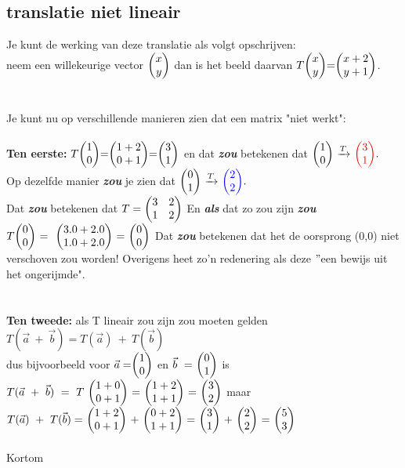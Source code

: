 \documentclass[hidelinks, a4wide, 12pt,  twoside]{book}
\begin{document}
\subsection{translatie niet lineair}
Je kunt de werking van deze translatie als volgt opschrijven:\\ neem een willekeurige vector $ \vectwee{x}{y} $ dan is het beeld daarvan $ T \vectwee{x}{y} = \vectwee{x+2}{y+1} $.\\ \\ \\
Je kunt nu op verschillende manieren zien dat een matrix "niet werkt":\\ \\
\textbf{ Ten eerste:} $ T \vectwee{1}{0} = \vectwee{1+2}{0+1} = \vectwee{3}{1} $ en dat \textit{\textbf{zou}} betekenen dat 
$ \vectwee{1}{0}  \  \xrightarrow{T}   \   \vectwee[red]{ 3 } {1}. $ \\ Op dezelfde manier \textit{\textbf{zou}} je zien dat  
$ \vectwee{0}{1}  \  \xrightarrow{T}   \   \vectwee[blue]{ 2 } {2}. $ \\ Dat \textbf{\textit{zou}} betekenen dat 
$ T = \begin{pmatrix}  3 & 2  \\  1 & 2  \end{pmatrix} $ En \textbf{\textit{als}} dat zo zou zijn \textbf{\textit{zou}} 
$  T \vectwee{0}{0} \ = \ 
\ \vectwee{ 3.0 + 2.0 }{ 1.0 + 2.0 } \ 
= \ \vectwee{0}{0} $ Dat \textbf{\textit{zou}} betekenen dat het de oorsprong (0,0) niet verschoven zou worden! Overigens heet zo'n redenering als deze  $"$een bewijs uit het ongerijmde".\\ \\ \\
\textbf{Ten tweede:} als T lineair zou zijn zou moeten gelden\\ 
$ T(\vec{a} \ + \ \vec{b} )  
=  T(\vec{a}) \ + \ T(\vec{b}) $ \\ dus bijvoorbeeld voor $ \vec{a} = \vectwee{1}{0} $ en   
$ \vec{b} \ = \ \vectwee{0}{1} $  is \\ 
$ T(\vec{a} \ + \ \vec{b} ) \ 
= \ T \ \vectwee{1+0}{0+1} \ 
= \  \vectwee{1+2}{1+1} \ 
= \ \vectwee{3}{2}  $ 
\quad maar \\
$ T(\vec{a}) \ + \ T(\vec{b}) 
= \  \vectwee{1+2}{0+1} \  + \  \vectwee{0+2}{1+1} \ 
= \  \vectwee{3}{1} \ + \  \vectwee{2}{2} \ 
= \  \vectwee{5}{3} \ 
$\\ \\
Kortom 
\end{document}
